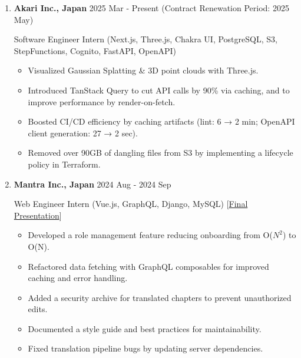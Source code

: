 \documentclass[
  a4paper,
  10pt,
  dvipdfmx
]{article}
\begin{document}
\begin{enumerate}[]
  \item \textbf{Akari Inc., Japan}  \hfill 2025 Mar - Present (Contract Renewation Period: 2025 May)

        Software Engineer Intern (Next.js, Three.js, Chakra UI, PostgreSQL, S3, StepFunctions, Cognito, FastAPI, OpenAPI)

        \begin{itemize}
          \item Visualized Gaussian Splatting \& 3D point clouds with Three.js.
          \item Introduced TanStack Query to cut API calls by 90\% via caching, and to improve performance by render-on-fetch.
          \item Boosted CI/CD efficiency by caching artifacts (lint: 6 → 2 min; OpenAPI client generation: 27 → 2 sec).
          \item Removed over 90GB of dangling files from S3 by implementing a lifecycle policy in Terraform.
        \end{itemize}

  \item \textbf{Mantra Inc., Japan} \hfill 2024 Aug - 2024 Sep

        Web Engineer Intern (Vue.js, GraphQL, Django, MySQL) [\href{https://mantra-present.vercel.app/1}{Final Presentation}]

        \begin{itemize}
          \item Developed a role management feature reducing onboarding from O($N^2$) to O(N).
          \item Refactored data fetching with GraphQL composables for improved caching and error handling.
          \item Added a security archive for translated chapters to prevent unauthorized edits.
          \item Documented a style guide and best practices for maintainability.
          \item Fixed translation pipeline bugs by updating server dependencies.
        \end{itemize}




\end{enumerate}
\end{document}
